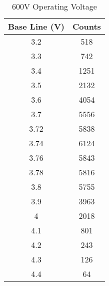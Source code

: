 \begin{table}[]
	\centering
	\begin{tabular}{|c|c|}
	\hline
	\textbf{Base Line (V)} & \textbf{Counts} \\ \hline
	3.2 & 518 \\ \hline
	3.3 & 742 \\ \hline
	3.4 & 1251 \\ \hline
	3.5 & 2132 \\ \hline
	3.6 & 4054 \\ \hline
	3.7 & 5556 \\ \hline
	3.72 & 5838 \\ \hline
	3.74 & 6124 \\ \hline
	3.76 & 5843 \\ \hline
	3.78 & 5816 \\ \hline
	3.8 & 5755 \\ \hline
	3.9 & 3963 \\ \hline
	4 & 2018 \\ \hline
	4.1 & 801 \\ \hline
	4.2 & 243 \\ \hline
	4.3 & 126 \\ \hline
	4.4 & 64 \\ \hline
	\end{tabular}
	\caption{600V Operating Voltage}
	\label{tab:sca600}
\end{table}